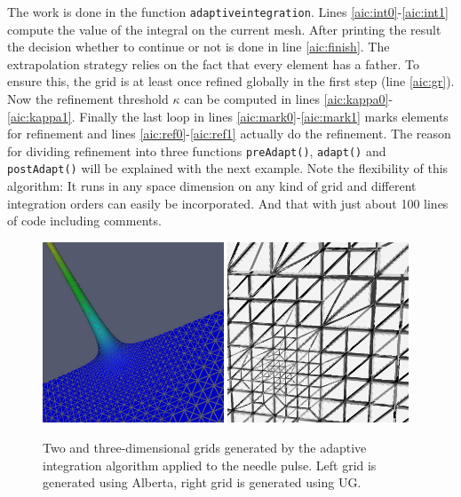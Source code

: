 \documentclass[11pt,a4paper,headinclude,footinclude,DIV16,normalheadings]{scrreprt}
\begin{document}
The work is done in the function \lstinline!adaptiveintegration!.
Lines \ref{aic:int0}-\ref{aic:int1} compute the value of the integral
on the current mesh. After printing the result the decision whether
to continue or not is done in line \ref{aic:finish}. The extrapolation
strategy relies on the fact that every element has a father. To ensure
this, the grid is at least once refined globally in the first step
(line \ref{aic:gr}). Now the refinement threshold $\kappa$ can be
computed in lines \ref{aic:kappa0}-\ref{aic:kappa1}. Finally the last
loop in lines \ref{aic:mark0}-\ref{aic:mark1} marks elements for
refinement and lines \ref{aic:ref0}-\ref{aic:ref1} actually do the
refinement. The reason for dividing refinement into three functions
\lstinline!preAdapt()!, \lstinline!adapt()! and
\lstinline!postAdapt()! will be explained with the next example. Note
the flexibility of this algorithm: It runs in any space dimension on
any kind of grid and different integration orders can easily be
incorporated. And that with just about 100 lines of code including
comments.

\begin{figure}
\includegraphics[width=0.48\textwidth]{EPS/adaptiveintegration_alberta2d}\hfill
\includegraphics[width=0.48\textwidth]{EPS/adaptiveintegration_ug3d}
\caption{Two and three-dimensional grids generated by the adaptive
  integration algorithm applied to the needle pulse. Left grid is
  generated using Alberta, right grid is generated using UG.}
\label{Fig:AdaptiveIntegration}
\end{figure}
\end{document}
